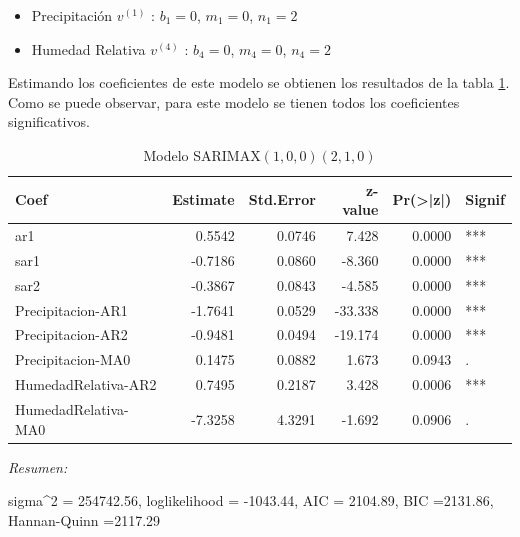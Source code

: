\documentclass[12pt,oneside]{book}\usepackage[]{graphicx}\usepackage[]{color}
\newenvironment{knitrout}{}{} %
\theoremstyle{definition} %
\begin{document}
\begin{itemize}
\item Precipitación $v^{(1)}$ : $b_1= 0$, $m_1=0$, $n_1=2$
\item Humedad Relativa $v^{(4)}$ : $b_4= 0$, $m_4=0$, $n_4=2$
\end{itemize}


Estimando los coeficientes de este modelo se obtienen los resultados de la tabla \ref{tab:sarimax_estim3}. Como se puede observar, para este modelo se tienen todos los coeficientes significativos. 


\begin{knitrout}
\color{fgcolor}\begin{table}

\caption{\label{tab:unnamed-chunk-56}\label{tab:sarimax_estim3}Modelo SARIMAX$(1,0,0)(2,1,0)$}
\centering
\begin{threeparttable}
\begin{tabular}[t]{lrrrrl}
\toprule
Coef & Estimate & Std.Error & z-value & Pr(>|z|) & Signif\\
\midrule
\rowcolor{gray!6}  ar1 & 0.5542 & 0.0746 & 7.428 & 0.0000 & ***\\
sar1 & -0.7186 & 0.0860 & -8.360 & 0.0000 & ***\\
\rowcolor{gray!6}  sar2 & -0.3867 & 0.0843 & -4.585 & 0.0000 & ***\\
Precipitacion-AR1 & -1.7641 & 0.0529 & -33.338 & 0.0000 & ***\\
\rowcolor{gray!6}  Precipitacion-AR2 & -0.9481 & 0.0494 & -19.174 & 0.0000 & ***\\
\addlinespace
Precipitacion-MA0 & 0.1475 & 0.0882 & 1.673 & 0.0943 & .\\
\rowcolor{gray!6}  HumedadRelativa-AR2 & 0.7495 & 0.2187 & 3.428 & 0.0006 & ***\\
HumedadRelativa-MA0 & -7.3258 & 4.3291 & -1.692 & 0.0906 & .\\
\bottomrule
\end{tabular}
\begin{tablenotes}
\item \textit{Resumen:} 
\item sigma\textasciicircum{}2 = 254742.56, loglikelihood = -1043.44, AIC = 2104.89, BIC =2131.86, Hannan-Quinn =2117.29
\end{tablenotes}
\end{threeparttable}
\end{table}


\end{knitrout}
\end{document}
